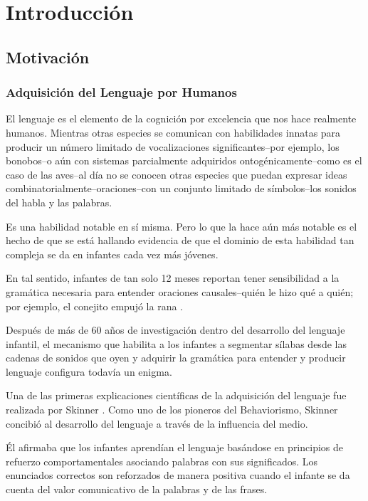 \chapter{Introducción}






\section{Motivación}

\subsection{Adquisición del Lenguaje por Humanos}

El lenguaje es el elemento de la cognición por excelencia que nos hace realmente humanos.
Mientras otras especies se comunican con habilidades innatas para producir un número limitado de vocalizaciones significantes--por ejemplo, los bonobos--o aún con sistemas parcialmente adquiridos ontogénicamente--como es el caso de las aves--al día no se conocen otras especies que puedan expresar ideas combinatorialmente--oraciones--con un conjunto limitado de símbolos--los sonidos del habla y las palabras.

Es una habilidad notable en sí misma. Pero lo que la hace aún más notable es el hecho de que se está hallando evidencia de que el dominio de esta habilidad tan compleja se da en infantes cada vez más jóvenes.

En tal sentido, infantes de tan solo 12 meses reportan tener sensibilidad a la gramática necesaria para entender oraciones causales--quién le hizo qué a quién; por ejemplo, el conejito empujó la rana \cite{doi:10.1080/15475441003769411}.

Después de más de 60 años de investigación dentro del desarrollo del lenguaje infantil, el mecanismo que habilita a los infantes a segmentar sílabas desde las cadenas de sonidos que oyen y adquirir la gramática para entender y producir lenguaje configura todavía un enigma.

Una de las primeras explicaciones científicas de la adquisición del lenguaje fue realizada por Skinner \cite{skinner1957verbal}.
Como uno de los pioneros del Behaviorismo, Skinner concibió al desarrollo del lenguaje a través de la influencia del medio.

Él afirmaba que los infantes aprendían el lenguaje basándose en principios de refuerzo comportamentales asociando palabras con sus significados.
Los enunciados correctos son reforzados de manera positiva cuando el infante se da cuenta del valor comunicativo de la palabras y de las frases.

